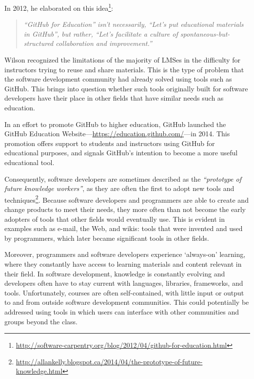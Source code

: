 In 2012, he elaborated on this idea\footnote{\url{http://software-carpentry.org/blog/2012/04/github-for-education.html}}:

\begin{quote}\textit{``GitHub for Education'' isn't necessarily, ``Let's put educational materials in GitHub'', but rather, ``Let's facilitate a culture of spontaneous-but-structured collaboration and improvement.''}\end{quote}

Wilson recognized the limitations of the majority of LMSes in the difficulty for instructors trying to reuse and share materials. This is the type of problem that the software development community had already solved using tools such as GitHub. This brings into question whether such tools originally built for software developers have their place in other fields that have similar needs such as education.

In an effort to promote GitHub to higher education, GitHub launched the GitHub Education Website---\url{https://education.github.com/}---in 2014. This promotion offers support to students and instructors using GitHub for educational purposes, and signals GitHub's intention to become a more useful educational tool.

Consequently, software developers are sometimes described as the \textit{``prototype of future knowledge workers''}, as they are often the first to adopt new tools and techniques\footnote{\url{http://allankelly.blogspot.ca/2014/04/the-prototype-of-future-knowledge.html}}. Because software developers and programmers are able to create and change products to meet their needs, they more often than not become the early adopters of tools that other fields would eventually use. This is evident in examples such as e-mail, the Web, and wikis: tools that were invented and used by programmers, which later became significant tools in other fields.


Moreover, programmers and software developers experience `always-on' learning, where they constantly have access to learning materials and content relevant in their field. In software development, knowledge is constantly evolving and developers often have to stay current with languages, libraries, frameworks, and tools. Unfortunately, courses are often self-contained, with little input or output to and from outside software development communities. This could potentially be addressed using tools in which users can interface with other communities and groups beyond the class.

